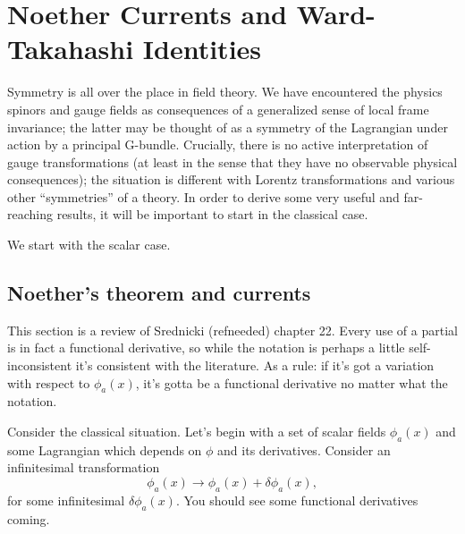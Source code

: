 \documentclass[main.tex]{subfiles}
\begin{document}
\chapter{Noether Currents and Ward-Takahashi Identities}
Symmetry is all over the place in field theory. We have encountered the physics spinors and gauge fields as consequences of a generalized sense of local frame invariance; the latter may be thought of as a symmetry of the Lagrangian under action by a principal G-bundle. Crucially, there is no active interpretation of gauge transformations (at least in the sense that they have no observable physical consequences); the situation is different with Lorentz transformations and various other ``symmetries'' of a theory. In order to derive some very useful and far-reaching results, it will be important to start in the classical case.

We start with the scalar case.
\section{Noether's theorem and currents}
This section is a review of Srednicki (refneeded) chapter 22.  Every use of a partial is in fact a functional derivative, so while the notation is perhaps a little self-inconsistent it's consistent with the literature. As a rule: if it's got a variation with respect to $\phi_a (x)$, it's gotta be a functional derivative no matter what the notation.

Consider the classical situation. Let's begin with a set of scalar fields $\phi_a(x)$ and some Lagrangian which depends on $\phi$ and its derivatives. Consider an infinitesimal transformation
\begin{equation} \label{varphi}
\phi_a (x) \to \phi_a(x) + \delta \phi_a (x),
\end{equation}
for some infinitesimal $\delta \phi_a(x)$. You should see some functional derivatives coming.
\end{document}
